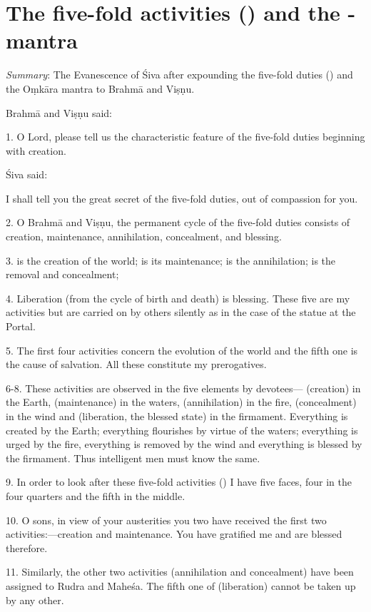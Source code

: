 \chapter{The five-fold activities () and the -mantra}

\emph{Summary}: The Evanescence of Śiva after expounding the five-fold duties
() and the Oṃkāra mantra to Brahmā and Viṣṇu.

Brahmā and Viṣṇu said:

1. O Lord, please tell us the characteristic feature of the five-fold duties
beginning with creation.

Śiva said:

I shall tell you the great secret of the five-fold duties, out of compassion
for you.

2. O Brahmā and Viṣṇu, the permanent cycle of the five-fold duties consists of
creation, maintenance, annihilation, concealment, and blessing.

3.  is the creation of the world;  is its maintenance;
 is the annihilation;  is the removal and concealment;

4. Liberation (from the cycle of birth and death) is blessing. These five are my
activities but are carried on by others silently as in the case of the statue
at the Portal.

5. The first four activities concern the evolution of the world and the fifth
one is the cause of salvation. All these constitute my prerogatives.

6-8. These activities are observed in the five elements by devotees—
(creation) in the Earth,  (maintenance) in the waters, 
(annihilation) in the fire,  (concealment) in the wind and
 (liberation, the blessed state) in the firmament. Everything is
created by the Earth; everything flourishes by virtue of the waters; everything
is urged by the fire, everything is removed by the wind and everything is
blessed by the firmament. Thus intelligent men must know the same.

9. In order to look after these five-fold activities () I have
five faces, four in the four quarters and the fifth in the middle.

10. O sons, in view of your austerities you two have received the first two
activities:—creation and maintenance. You have gratified me and are blessed
therefore.

11. Similarly, the other two activities (annihilation and concealment) have been
assigned to Rudra and Maheśa. The fifth one of  (liberation) cannot
be taken up by any other.

